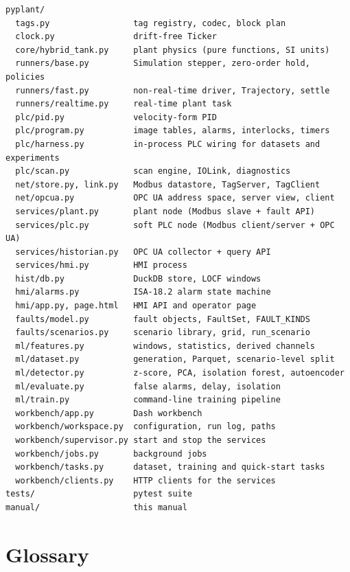 \begin{lstlisting}[style=sh]
pyplant/
  tags.py                 tag registry, codec, block plan
  clock.py                drift-free Ticker
  core/hybrid_tank.py     plant physics (pure functions, SI units)
  runners/base.py         Simulation stepper, zero-order hold, policies
  runners/fast.py         non-real-time driver, Trajectory, settle
  runners/realtime.py     real-time plant task
  plc/pid.py              velocity-form PID
  plc/program.py          image tables, alarms, interlocks, timers
  plc/harness.py          in-process PLC wiring for datasets and experiments
  plc/scan.py             scan engine, IOLink, diagnostics
  net/store.py, link.py   Modbus datastore, TagServer, TagClient
  net/opcua.py            OPC UA address space, server view, client
  services/plant.py       plant node (Modbus slave + fault API)
  services/plc.py         soft PLC node (Modbus client/server + OPC UA)
  services/historian.py   OPC UA collector + query API
  services/hmi.py         HMI process
  hist/db.py              DuckDB store, LOCF windows
  hmi/alarms.py           ISA-18.2 alarm state machine
  hmi/app.py, page.html   HMI API and operator page
  faults/model.py         fault objects, FaultSet, FAULT_KINDS
  faults/scenarios.py     scenario library, grid, run_scenario
  ml/features.py          windows, statistics, derived channels
  ml/dataset.py           generation, Parquet, scenario-level split
  ml/detector.py          z-score, PCA, isolation forest, autoencoder
  ml/evaluate.py          false alarms, delay, isolation
  ml/train.py             command-line training pipeline
  workbench/app.py        Dash workbench
  workbench/workspace.py  configuration, run log, paths
  workbench/supervisor.py start and stop the services
  workbench/jobs.py       background jobs
  workbench/tasks.py      dataset, training and quick-start tasks
  workbench/clients.py    HTTP clients for the services
tests/                    pytest suite
manual/                   this manual
\end{lstlisting}

\section{Glossary}

